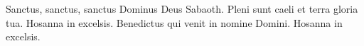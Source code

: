 Sanctus, sanctus, sanctus Dominus Deus Sabaoth.
Pleni sunt caeli et terra gloria tua.
Hosanna in excelsis.
Benedictus qui venit in nomine Domini.
Hosanna in excelsis.